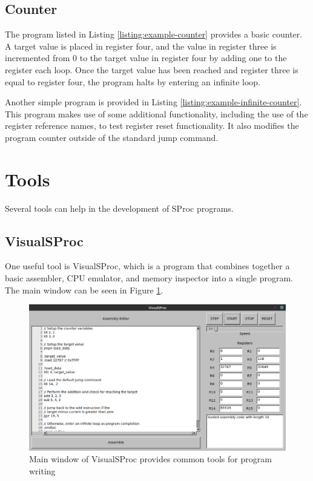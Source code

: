 \documentclass{article}
\begin{document}
\subsection{Counter}

The program listed in Listing \ref{listing:example-counter} provides a basic counter. A target value is placed in register four, and the value in register three is incremented from 0 to the target value in register four by adding one to the register each loop. Once the target value has been reached and register three is equal to register four, the program halts by entering an infinite loop.



Another simple program is provided in Listing \ref{listing:example-infinite-counter}. This program makes use of some additional functionality, including the use of the register reference names, to test register reset functionality. It also modifies the program counter outside of the standard jump command.



\pagebreak

\section{Tools}

Several tools can help in the development of SProc programs.

\subsection{VisualSProc}

One useful tool is VisualSProc, which is a program that combines together a basic assembler, CPU emulator, and memory inspector into a single program. The main window can be seen in Figure \ref{fig:visual-sproc-main-page}.

\begin{figure}[h!]
	\centering
	\includegraphics[width=5in]{images/visual-sproc.png}
	\caption{Main window of VisualSProc provides common tools for program writing}
	\label{fig:visual-sproc-main-page}
\end{figure}
\end{document}
